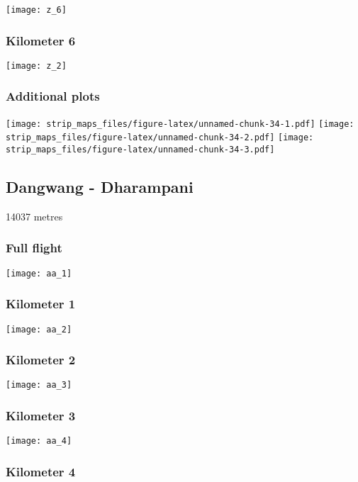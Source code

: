 \documentclass[]{article}
\begin{document}
\texttt{[image: z\_6]}

\subsubsection{Kilometer 6}\label{kilometer-6-15}

\texttt{[image: z\_2]}

\subsubsection{Additional plots}\label{additional-plots-25}

\texttt{[image: strip\_maps\_files/figure-latex/unnamed-chunk-34-1.pdf]}
\texttt{[image: strip\_maps\_files/figure-latex/unnamed-chunk-34-2.pdf]}
\texttt{[image: strip\_maps\_files/figure-latex/unnamed-chunk-34-3.pdf]}

\newpage

\subsection{Dangwang - Dharampani}\label{dangwang---dharampani}

14037 metres

\subsubsection{Full flight}\label{full-flight-26}

\texttt{[image: aa\_1]}

\subsubsection{Kilometer 1}\label{kilometer-1-26}

\texttt{[image: aa\_2]}

\subsubsection{Kilometer 2}\label{kilometer-2-26}

\texttt{[image: aa\_3]}

\subsubsection{Kilometer 3}\label{kilometer-3-26}

\texttt{[image: aa\_4]}

\subsubsection{Kilometer 4}\label{kilometer-4-25}
\end{document}
